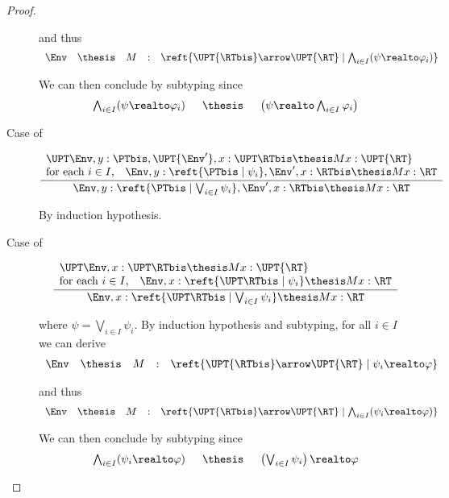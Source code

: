 \begin{proof}
\begin{description}
\noindent
and thus
\[
\begin{array}{*{5}{l}}
  \Env
& \thesis
& M
& :
& \reft{\UPT{\RTbis} \arrow \UPT{\RT} \mid \bigwedge_{i \in I}(\psi \realto \varphi_i)}
\end{array}
\]

\noindent
We can then conclude by subtyping since
\[
\begin{array}{l !{\quad\thesis\quad} l}
  \bigwedge_{i \in I}(\psi \realto \varphi_i)
& \left( \psi \realto \bigwedge_{i \in I}\varphi_i \right)
\end{array}
\]

\item[Case of]
\[
\dfrac{
  \begin{array}{l}
  \UPT\Env, y:\PTbis, \UPT{\Env'},x : \UPT\RTbis \thesis M x : \UPT{\RT}
  \\
  \text{for each $i \in I$,}\quad
  \Env, y:\reft{\PTbis \mid \psi_i},\Env',x : \RTbis \thesis M x : \RT
  \end{array}}
  {\Env, y : \reft{\PTbis \mid \bigvee_{i \in I} \psi_i} , \Env', x : \RTbis
  \thesis M x : \RT}
\]

By induction hypothesis.

\item[Case of]
\[
\dfrac{
  \begin{array}{l}
  \UPT\Env, x:\UPT\RTbis \thesis M x  : \UPT{\RT}
  \\
  \text{for each $i \in I$,}\quad
  \Env, x:\reft{\UPT\RTbis \mid \psi_i} \thesis M x : \RT
  \end{array}}
  {\Env, x : \reft{\UPT\RTbis \mid \bigvee_{i \in I} \psi_i} \thesis M x : \RT}
\]

\noindent
where $\psi = \bigvee_{i \in I}\psi_i$.
By induction hypothesis and subtyping,
for all $i \in I$ we can derive
\[
\begin{array}{*{5}{l}}
  \Env
& \thesis
& M
& :
& \reft{\UPT{\RTbis} \arrow \UPT{\RT} \mid \psi_i \realto \varphi}
\end{array}
\]

\noindent
and thus
\[
\begin{array}{*{5}{l}}
  \Env
& \thesis
& M
& :
& \reft{\UPT{\RTbis} \arrow \UPT{\RT} \mid \bigwedge_{i \in I}(\psi_i \realto \varphi)}
\end{array}
\]

We can then conclude by subtyping since
\[
\begin{array}{l !{\quad\thesis\quad} l}
  \bigwedge_{i \in I}(\psi_i \realto \varphi)
& \left( \bigvee_{i \in I} \psi_i \right) \realto \varphi
\end{array}
\]


\end{description}
\end{proof}
